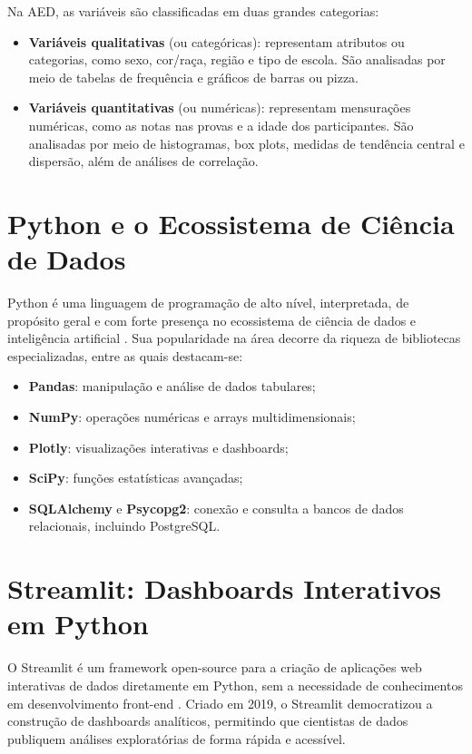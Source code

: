 \documentclass[
    12pt,
    oneside,
    a4paper,
    chapter=TITLE,
    section=TITLE
]{abntex2}
\begin{document}
Na AED, as variáveis são classificadas em duas grandes categorias:

\begin{itemize}
    \item \textbf{Variáveis qualitativas} (ou categóricas): representam atributos ou categorias,
    como sexo, cor/raça, região e tipo de escola. São analisadas por meio de tabelas de frequência
    e gráficos de barras ou pizza.

    \item \textbf{Variáveis quantitativas} (ou numéricas): representam mensurações numéricas,
    como as notas nas provas e a idade dos participantes. São analisadas por meio de histogramas,
    box plots, medidas de tendência central e dispersão, além de análises de correlação.
\end{itemize}

\section{Python e o Ecossistema de Ciência de Dados}

Python é uma linguagem de programação de alto nível, interpretada, de propósito geral e com
forte presença no ecossistema de ciência de dados e inteligência artificial \cite{vanderplas2016}.
Sua popularidade na área decorre da riqueza de bibliotecas especializadas, entre as quais
destacam-se:

\begin{itemize}
    \item \textbf{Pandas}: manipulação e análise de dados tabulares;
    \item \textbf{NumPy}: operações numéricas e arrays multidimensionais;
    \item \textbf{Plotly}: visualizações interativas e dashboards;
    \item \textbf{SciPy}: funções estatísticas avançadas;
    \item \textbf{SQLAlchemy} e \textbf{Psycopg2}: conexão e consulta a bancos de dados
    relacionais, incluindo PostgreSQL.
\end{itemize}

\section{Streamlit: Dashboards Interativos em Python}

O Streamlit é um framework open-source para a criação de aplicações web interativas de dados
diretamente em Python, sem a necessidade de conhecimentos em desenvolvimento front-end
\cite{streamlit2024}. Criado em 2019, o Streamlit democratizou a construção de dashboards
analíticos, permitindo que cientistas de dados publiquem análises exploratórias de forma
rápida e acessível.
\end{document}
